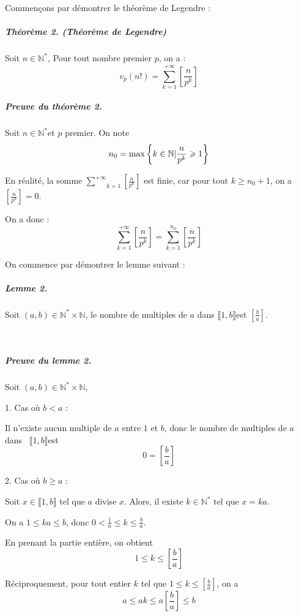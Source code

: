 Commen{\c c}ons par d{\'e}montrer le th{\'e}or{\`e}me de Legendre :

\subparagraph{Th{\'e}or{\`e}me 2. (Th{\'e}or{\`e}me de Legendre)}

Soit $n \in \mathbb{N}^{\ast}$, Pour tout nombre premier $p$, on a :
\[ v_p (n!) = \underset{k = 1}{\overset{+ \infty}{\sum}} \left[ \frac{n}{p^k}
   \right] \]
\tmtextbf{}

\subparagraph{Preuve du th{\'e}or{\`e}me 2.}

Soit $n \in \mathbb{N}^{\ast} $et $p$ premier. On note
\[ n_0 = \max \left\{ k \in \mathbb{N} |   \frac{n}{p^k} \geqslant
   1 \right\} \]


En r{\'e}alit{\'e}, la somme $\underset{k = 1}{\overset{+ \infty}{\sum}}
\left[ \frac{n}{p^k} \right]$ est finie, car pour tout $k \geqslant n_0 + 1$,
on a $\left[ \frac{n}{p^k} \right] = 0$.

On a donc :
\[ \underset{k = 1}{\overset{+ \infty}{\sum}} \left[ \frac{n}{p^k} \right] =
   \underset{k = 1}{\overset{n_0}{\sum}} \left[ \frac{n}{p^k} \right] \]


On commence par d{\'e}montrer le lemme suivant :

\subparagraph{Lemme 2.}

Soit $(a, b) \in \mathbb{N}^{\ast} \times \mathbb{N}$, le nombre de multiples
de $a$ dans $\llbracket 1, b \rrbracket $est $ \left[ \frac{b}{a} \right]$.

\

\subparagraph{Preuve du lemme 2.}

Soit $(a, b) \in \mathbb{N}^{\ast} \times \mathbb{N}$,

1. Cas o{\`u} $b < a$ :

Il n'existe aucun multiple de $a$ entre $1$ et $b$, donc le nombre de
multiples de $a$ dans \ $\llbracket 1, b \rrbracket $est
\[ 0 = \left[ \frac{b}{a} \right] \]


2. Cas o{\`u} $b \geqslant a$ :

Soit $x \in \llbracket 1, b \rrbracket$ tel que $a$ divise $x$. Alors, il
existe $k \in \mathbb{N}^{\ast}$ tel que $x = k a$.

On a $1 \leqslant k a \leqslant b$, donc $0 < \frac{1}{a} \leqslant k
\leqslant \frac{b}{a}$.

En prenant la partie enti{\`e}re, on obtient
\[ 1 \leqslant k \leqslant \left[ \frac{b}{a} \right] \]


R{\'e}ciproquement, pour tout entier $k$ tel que $1 \leqslant k \leqslant
\left[ \frac{b}{a} \right]$, on a
\[ a \leqslant a k \leqslant a \left[ \frac{b}{a} \right] \leqslant b \]



